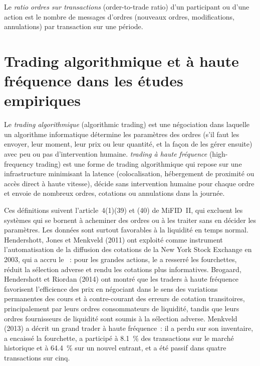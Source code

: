 \begin{definition}\label{def:mx:market-quality-and-regulation:otr}
Le \emph{ratio ordres sur transactions} (order-to-trade ratio) d'un participant ou d'une action est le nombre de messages d'ordres (nouveaux ordres, modifications,
annulations) par transaction sur une période.
\end{definition}

\section{Trading algorithmique et à haute fréquence dans les études empiriques}

\begin{definition}\label{def:mx:market-quality-and-regulation:hft}
Le \emph{trading algorithmique} (algorithmic trading) est une négociation dans laquelle un algorithme informatique détermine les paramètres des ordres (s'il faut les envoyer,
leur moment, leur prix ou leur quantité, et la façon de les gérer ensuite) avec peu ou pas d'intervention humaine. \emph{trading à haute
fréquence} (high-frequency trading) est une forme de trading algorithmique qui repose sur une infrastructure minimisant la latence (colocalisation, hébergement de proximité ou
accès direct à haute vitesse), décide sans intervention humaine pour chaque ordre et envoie de nombreux ordres, cotations ou annulations dans la journée.
\end{definition}

Ces définitions suivent l'article~4(1)(39) et (40) de MiFID~II, qui excluent les systèmes qui se bornent à acheminer des ordres ou à les traiter sans en décider les
paramètres. Les données sont surtout favorables à la liquidité en temps normal. Hendershott, Jones et Menkveld (2011) ont exploité comme instrument l'automatisation de la diffusion des cotations de la New York Stock Exchange
en 2003, qui a accru le ~: pour les grandes actions, le  a resserré
les fourchettes, réduit la sélection adverse et rendu les cotations plus informatives. Brogaard, Hendershott et Riordan (2014) ont montré que les traders à haute fréquence
favorisent l'efficience des prix en négociant dans le sens des variations permanentes des cours et à contre-courant des erreurs de cotation transitoires, principalement par leurs
ordres consommateurs de liquidité, tandis que leurs ordres fournisseurs de liquidité sont soumis à la sélection adverse. Menkveld (2013) a décrit un grand trader à haute
fréquence~: il a perdu sur son inventaire, a encaissé la fourchette, a participé à 8.1~\% des transactions sur le marché historique et à 64.4~\% sur un nouvel entrant, et a été passif dans
quatre transactions sur cinq.

